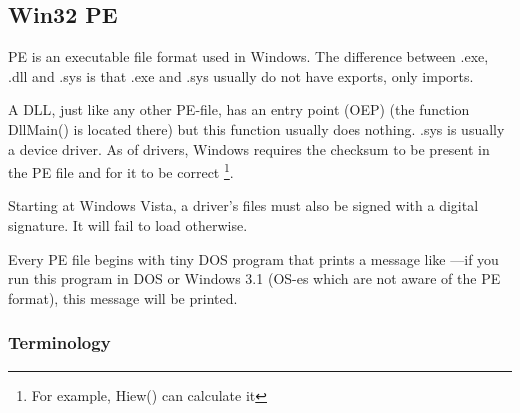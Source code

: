 \subsection{Win32 PE}
\label{win32_pe}

\acs{PE} is an executable file format used in Windows.
The difference between .exe, .dll and .sys is that .exe and .sys usually do not have exports, only imports.


A \ac{DLL}, just like any other PE-file, has an entry point (\ac{OEP}) (the function DllMain() is located there) 
but this function usually does nothing.
.sys is usually a device driver.
As of drivers, Windows requires the checksum to be present in the PE file and for it to be correct
\footnote{For example, Hiew() can calculate it}.

Starting at Windows Vista, a driver's files must also be signed with a digital signature. It will fail to load otherwise.

Every PE file begins with tiny DOS program that prints a
message like ---if you run this program in DOS or Windows 3.1 (\ac{OS}-es which are not aware of the PE format), 
this message will be printed.

\subsubsection{Terminology}


